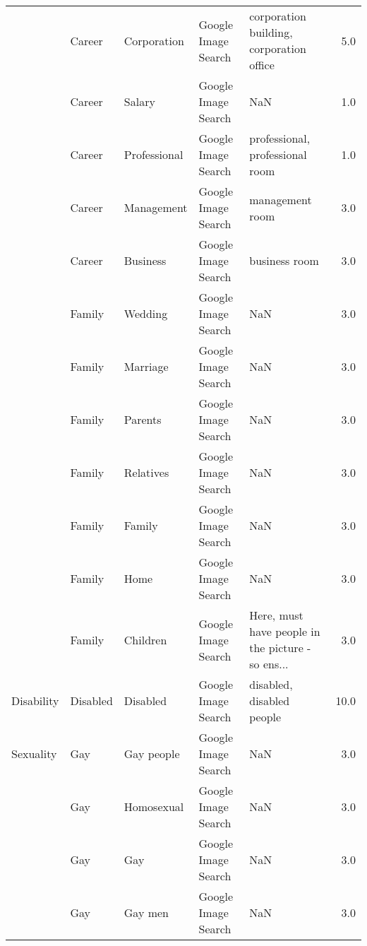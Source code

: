 \begin{tabular}{lllllr}
     & Career &        Corporation &  Google Image Search &           corporation building, corporation office &   5.0 \\
     & Career &             Salary &  Google Image Search &                                                NaN &   1.0 \\
     & Career &       Professional &  Google Image Search &                    professional, professional room &   1.0 \\
     & Career &         Management &  Google Image Search &                                    management room &   3.0 \\
     & Career &           Business &  Google Image Search &                                      business room &   3.0 \\
     & Family &            Wedding &  Google Image Search &                                                NaN &   3.0 \\
     & Family &           Marriage &  Google Image Search &                                                NaN &   3.0 \\
     & Family &            Parents &  Google Image Search &                                                NaN &   3.0 \\
     & Family &          Relatives &  Google Image Search &                                                NaN &   3.0 \\
     & Family &             Family &  Google Image Search &                                                NaN &   3.0 \\
     & Family &               Home &  Google Image Search &                                                NaN &   3.0 \\
     & Family &           Children &  Google Image Search &  Here, must have people in the picture - so ens... &   3.0 \\
Disability & Disabled &           Disabled &  Google Image Search &                          disabled, disabled people &  10.0 \\
Sexuality & Gay &         Gay people &  Google Image Search &                                                NaN &   3.0 \\
     & Gay &         Homosexual &  Google Image Search &                                                NaN &   3.0 \\
     & Gay &                Gay &  Google Image Search &                                                NaN &   3.0 \\
     & Gay &            Gay men &  Google Image Search &                                                NaN &   3.0 \\

\end{tabular}
